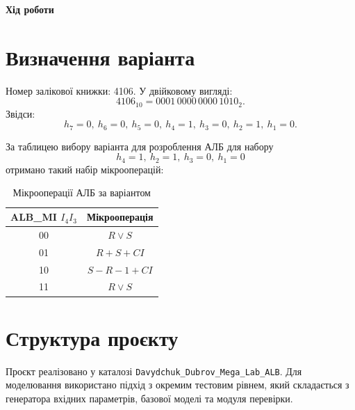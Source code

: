 \documentclass[12pt,a4paper]{article}
\begin{document}
\begin{center}
    \textbf{\Large Хід роботи}
\end{center}

\section*{Визначення варіанта}

Номер залікової книжки: 4106. У двійковому вигляді:
\[
4106_{10}=0001\,0000\,0000\,1010_2.
\]
Звідси:
\[
h_7=0,\ h_6=0,\ h_5=0,\ h_4=1,\ h_3=0,\ h_2=1,\ h_1=0.
\]

За таблицею вибору варіанта для розроблення АЛБ для набору
\[
h_4=1,\ h_2=1,\ h_3=0,\ h_1=0
\]
отримано такий набір мікрооперацій:

\begin{table}[H]
    \centering
    \renewcommand{\arraystretch}{1.3}
    \begin{tabular}{|c|c|}
        \hline
        \textbf{ALB\_MI $I_4I_3$} & \textbf{Мікрооперація} \\
        \hline
        00 & $R \vee S$ \\
        \hline
        01 & $R + S + CI$ \\
        \hline
        10 & $S - R - 1 + CI$ \\
        \hline
        11 & $R \vee S$ \\
        \hline
    \end{tabular}
    \caption{Мікрооперації АЛБ за варіантом}
\end{table}

\section*{Структура проєкту}

Проєкт реалізовано у каталозі \texttt{Davydchuk\_Dubrov\_Mega\_Lab\_ALB}. Для моделювання використано підхід з окремим тестовим рівнем, який складається з генератора вхідних параметрів, базової моделі та модуля перевірки.
\end{document}
